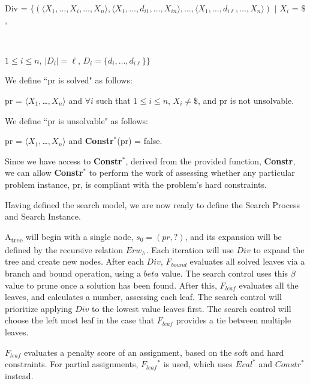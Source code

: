 \documentclass[11pt, oneside]{article}   	%
\begin{document}
\noindent \centerline{Div = $\{(\langle X_1, \dots, X_i, \dots, X_n \rangle, \langle X_1, \dots, d_{i1}, \dots, X_{in} \rangle, \dots, \langle X_1, \dots, d_{i\ell}, \dots, X_n \rangle)$ $\vert$ $X_i$ = $\$$,}\\
\centerline{$1 \le i \le n$, $\vert D_i \vert = \ell$, $D_i = \{d_i, \dots, d_{i\ell}\}\}$}

\noindent We define ``pr is solved" as follows:

\begin{center}
{pr = $\langle$$X_{1}, $\dots$, X_{n}$$\rangle$ and $\forall$$i$ such that $1 \le i \le n$, $X_{i} \neq \$$, and pr is not unsolvable.}
\end{center}

\noindent We define ``pr is unsolvable" as follows:

\begin{center}
{pr = $\langle$$X_{1}, $\dots$, X_{n}$$\rangle$ and \textbf{Constr$^{\ast}$}(pr) = false.}
\end{center}

\noindent Since we have access to \textbf{Constr$^{\ast}$}, derived from the provided function, \textbf{Constr}, we can allow  \textbf{Constr$^{\ast}$} to perform the work of assessing whether any particular problem instance, pr, is compliant with the problem's hard constraints.


\noindent Having defined the search model, we are now ready to define the Search Process and Search Instance.

\noindent A\textsubscript{tree} will begin with a single node, $s_0 = (pr, ?)$, and its expansion will be defined by the recursive relation $Erw_{\land}$. Each iteration will use $Div$ to expand the tree and create new nodes. After each $Div$, $F_{bound}$ evaluates all solved leaves via a branch and bound operation, using a $beta$ value. The search control uses this $\beta$ value to prune once a solution has been found. After this, $F_{leaf}$  evaluates all the leaves, and calculates a number, assessing each leaf. The search control will prioritize applying $Div$ to the lowest value leaves first. The search control will choose the left most leaf in the case that $F_{leaf}$ provides a tie between multiple leaves.

\noindent $F_{leaf}$ evaluates a penalty score of an assignment, based on the soft and hard constraints. For partial assignments, $F_{leaf}$$^*$ is used, which uses $Eval^*$ and $Constr^*$ instead. 
\end{document}
